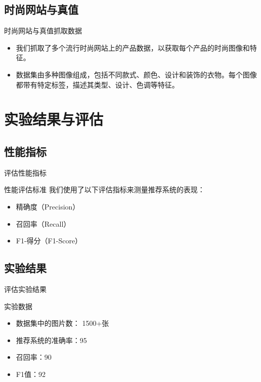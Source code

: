 \documentclass[10pt]{beamer}
\begin{document}
\subsection{时尚网站与真值}
\begin{frame}{时尚网站与真值}{抓取数据}
\begin{itemize}
    \item 我们抓取了多个流行时尚网站上的产品数据，以获取每个产品的时尚图像和特征。
    \item 数据集由多种图像组成，包括不同款式、颜色、设计和装饰的衣物。每个图像都带有特定标签，描述其类型、设计、色调等特征。
\end{itemize}
\end{frame}

\section{实验结果与评估}
\subsection{性能指标}
\begin{frame}{评估}{性能指标}
\begin{block}{性能评估标准}
    我们使用了以下评估指标来测量推荐系统的表现：
    \begin{itemize}
        \item 精确度（Precision）
        \item 召回率（Recall）
        \item F1-得分（F1-Score）
    \end{itemize}
\end{block}
\end{frame}

\subsection{实验结果}
\begin{frame}{评估}{实验结果}
\begin{block}{实验数据}
    \begin{itemize}
        \item 数据集中的图片数： 1500+张
        \item 推荐系统的准确率：95%
        \item 召回率：90%
        \item F1值：92%
    \end{itemize}
\end{block}
\end{frame}
\end{document}
